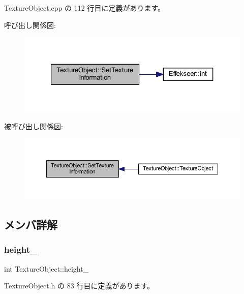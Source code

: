 Texture\+Object.\+cpp の 112 行目に定義があります。

呼び出し関係図\+:\nopagebreak
\begin{figure}[H]
\begin{center}
\leavevmode
\includegraphics[width=321pt]{class_texture_object_a76d33ff56004c8f8f00b004849990940_cgraph}
\end{center}
\end{figure}
被呼び出し関係図\+:\nopagebreak
\begin{figure}[H]
\begin{center}
\leavevmode
\includegraphics[width=350pt]{class_texture_object_a76d33ff56004c8f8f00b004849990940_icgraph}
\end{center}
\end{figure}


\subsection{メンバ詳解}
\mbox{\label{class_texture_object_a093e31e35a181fe208cc8a0c0cdb5e2f}} 
\subsubsection{\texorpdfstring{height\+\_\+}{height\_}}
{\footnotesize\ttfamily int Texture\+Object\+::height\+\_\+\hspace{0.3cm}{\ttfamily [private]}}



 Texture\+Object.\+h の 83 行目に定義があります。

